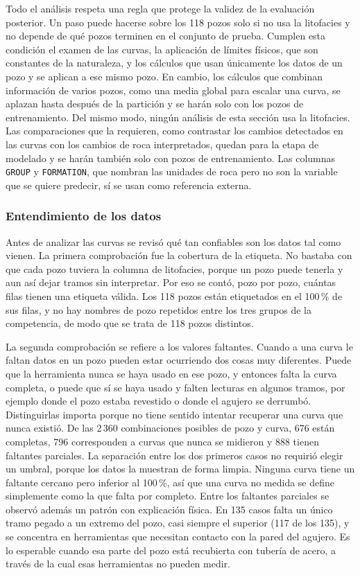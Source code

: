 \documentclass[11pt,a4paper]{article}
\begin{document}
Todo el análisis respeta una regla que protege la validez de la evaluación posterior. Un paso puede hacerse sobre los 118 pozos solo si no usa la litofacies y no depende de qué pozos terminen en el conjunto de prueba. Cumplen esta condición el examen de las curvas, la aplicación de límites físicos, que son constantes de la naturaleza, y los cálculos que usan únicamente los datos de un pozo y se aplican a ese mismo pozo. En cambio, los cálculos que combinan información de varios pozos, como una media global para escalar una curva, se aplazan hasta después de la partición y se harán solo con los pozos de entrenamiento. Del mismo modo, ningún análisis de esta sección usa la litofacies. Las comparaciones que la requieren, como contrastar los cambios detectados en las curvas con los cambios de roca interpretados, quedan para la etapa de modelado y se harán también solo con pozos de entrenamiento. Las columnas \texttt{GROUP} y \texttt{FORMATION}, que nombran las unidades de roca pero no son la variable que se quiere predecir, sí se usan como referencia externa.

\subsubsection{Entendimiento de los datos}
\label{sec:eda-entendimiento}

Antes de analizar las curvas se revisó qué tan confiables son los datos tal como vienen. La primera comprobación fue la cobertura de la etiqueta. No bastaba con que cada pozo tuviera la columna de litofacies, porque un pozo puede tenerla y aun así dejar tramos sin interpretar. Por eso se contó, pozo por pozo, cuántas filas tienen una etiqueta válida. Los 118 pozos están etiquetados en el 100\,\% de sus filas, y no hay nombres de pozo repetidos entre los tres grupos de la competencia, de modo que se trata de 118 pozos distintos.

La segunda comprobación se refiere a los valores faltantes. Cuando a una curva le faltan datos en un pozo pueden estar ocurriendo dos cosas muy diferentes. Puede que la herramienta nunca se haya usado en ese pozo, y entonces falta la curva completa, o puede que sí se haya usado y falten lecturas en algunos tramos, por ejemplo donde el pozo estaba revestido o donde el agujero se derrumbó. Distinguirlas importa porque no tiene sentido intentar recuperar una curva que nunca existió. De las 2\,360 combinaciones posibles de pozo y curva, 676 están completas, 796 corresponden a curvas que nunca se midieron y 888 tienen faltantes parciales. La separación entre los dos primeros casos no requirió elegir un umbral, porque los datos la muestran de forma limpia. Ninguna curva tiene un faltante cercano pero inferior al 100\,\%, así que una curva no medida se define simplemente como la que falta por completo. Entre los faltantes parciales se observó además un patrón con explicación física. En 135 casos falta un único tramo pegado a un extremo del pozo, casi siempre el superior (117 de los 135), y se concentra en herramientas que necesitan contacto con la pared del agujero. Es lo esperable cuando esa parte del pozo está recubierta con tubería de acero, a través de la cual esas herramientas no pueden medir.
\end{document}
